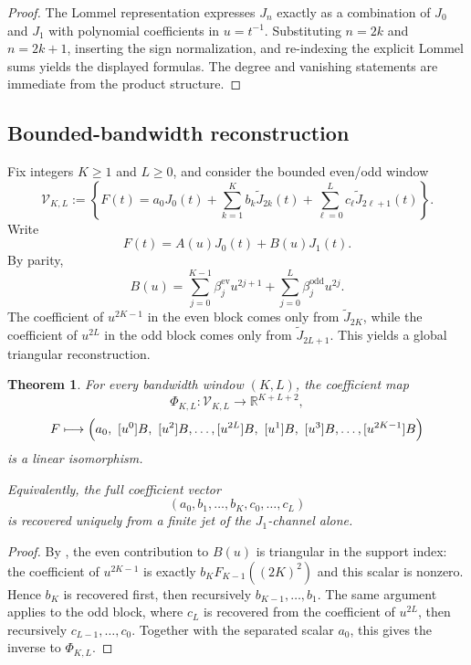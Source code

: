 \documentclass[11pt,reqno]{amsart}
\newtheorem{theorem}{Theorem}[section]
\theoremstyle{definition}
\newcommand{\R}{\mathbb{R}}
\begin{document}
\begin{proof}
The Lommel representation expresses $J_n$ exactly as a combination of $J_0$ and $J_1$ with
polynomial coefficients in $u=t^{-1}$. Substituting $n=2k$ and $n=2k+1$, inserting the sign
normalization, and re-indexing the explicit Lommel sums yields the displayed formulas. The
degree and vanishing statements are immediate from the product structure.
\end{proof}

\subsection*{Bounded-bandwidth reconstruction}

Fix integers $K\ge 1$ and $L\ge 0$, and consider the bounded even/odd window
\[
\mathcal V_{K,L}
:=
\left\{
F(t)=a_0J_0(t)+\sum_{k=1}^{K} b_k \widetilde J_{2k}(t)
+\sum_{\ell=0}^{L} c_\ell \widetilde J_{2\ell+1}(t)
\right\}.
\]
Write
\[
F(t)=A(u)J_0(t)+B(u)J_1(t).
\]
By parity,
\[
B(u)=\sum_{j=0}^{K-1}\beta^{\mathrm{ev}}_j u^{2j+1}
+\sum_{j=0}^{L}\beta^{\mathrm{odd}}_j u^{2j}.
\]
The coefficient of $u^{2K-1}$ in the even block comes only from $\widetilde J_{2K}$, while the
coefficient of $u^{2L}$ in the odd block comes only from $\widetilde J_{2L+1}$. This yields a
global triangular reconstruction.

\begin{theorem}\label{thm:bounded-bandwidth-reconstruction}
For every bandwidth window $(K,L)$, the coefficient map
\[
\Phi_{K,L}:\mathcal V_{K,L}\to \R^{K+L+2},
\]
\[
F\longmapsto
\Bigl(
a_0,\ 
[u^0]B,\ [u^2]B,\dots,[u^{2L}]B,\ 
[u^1]B,\ [u^3]B,\dots,[u^{2K-1}]B
\Bigr)
\]
is a linear isomorphism.

Equivalently, the full coefficient vector
\[
(a_0,b_1,\dots,b_K,c_0,\dots,c_L)
\]
is recovered uniquely from a finite jet of the $J_1$-channel alone.
\end{theorem}

\begin{proof}
By , the even contribution to $B(u)$ is triangular in the
support index: the coefficient of $u^{2K-1}$ is exactly $b_KF_{K-1}((2K)^2)$ and this scalar is
nonzero. Hence $b_K$ is recovered first, then recursively $b_{K-1},\dots,b_1$. The same
argument applies to the odd block, where $c_L$ is recovered from the coefficient of $u^{2L}$,
then recursively $c_{L-1},\dots,c_0$. Together with the separated scalar $a_0$, this gives the
inverse to $\Phi_{K,L}$.
\end{proof}
\end{document}

